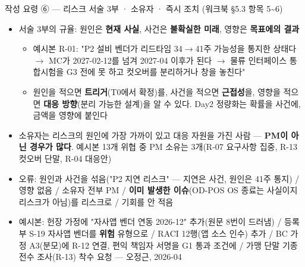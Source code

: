 \begin{frame}[allowframebreaks=1.0]{작성 요령 ⑥ — 리스크 서술 3부 · 소유자 · 즉시 조치 (워크북 §5.3 항목 5\textasciitilde{}6)}
\small
\par\smallskip{}\nobreak
\begin{itemize}
\item\relax 서술 3부의 규율: 원인은 \textbf{현재 사실}, 사건은 \textbf{불확실한 미래}, 영향은 \textbf{목표에의 결과}
\par\nobreak
\begin{itemize}
\item\relax 예시본 R-01: "P2 설비 벤더가 리드타임 34$\rightarrow$41주 가능성을 통지한 상태다 $\rightarrow$ MC가 2027-02-12를 넘겨 2027-04 이후가 된다 $\rightarrow$ 물류 인터페이스 통합시험을 G3 전에 못 하고 컷오버를 분리하거나 창을 놓친다"
\item\relax 원인을 적으면 \textbf{트리거}(T0에서 확정)를, 사건을 적으면 \textbf{근접성}을, 영향을 적으면 \textbf{대응 방향}(분리 가능한 설계)을 알 수 있다. Day2 정량화는 확률을 사건에, 금액을 영향에 붙인다
\end{itemize}
\item\relax 소유자는 리스크의 원인에 가장 가까이 있고 대응 자원을 가진 사람 — \textbf{PM이 아닌 경우가 많다}. 예시본 13개 위협 중 PM 소유는 3개(R-07 요구사항 집중, R-13 컷오버 단말, R-04 대응안)
\item\relax 오류: 원인과 사건을 섞음("P2 지연 리스크" — 지연은 사건, 원인은 41주 통지) / 영향 없음 / 소유자 전부 PM / \textbf{이미 발생한 이슈}(OD-POS OS 종료는 사실이지 리스크가 아님)를 리스크로 / 기회를 안 적음
\end{itemize}
\par\smallskip{}\nobreak
\begin{itemize}
\item\relax 예시본: 헌장 가정에 "자사앱 벤더 연동 2026-12" 추가(원문 8번이 드러냄) / 등록부 S-19 자사앱 벤더를 \textbf{위험} 유형으로 / RACI 12행(앱 소스 인수) 추가 / BC 가정 A3(분모)에 R-12 연결, 편익 책임자 서명을 G1 통과 조건에 / 가맹 단말 기종 전수 조사(R-13) 착수 요청 — 오정근, 2026-04
\end{itemize}
\end{frame}

